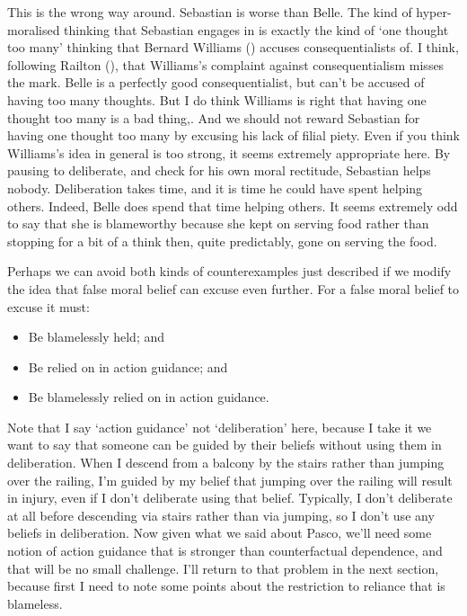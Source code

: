 \documentclass[
  10pt,
  letterpaper,
  twoside]{scrbook}
\providecommand{\tightlist}{%
  \setlength{\itemsep}{0pt}\setlength{\parskip}{0pt}}\usepackage{longtable,booktabs,array}
\begin{document}
This is the wrong way around. {Sebastian} is worse than {Belle}. The
kind of hyper-moralised thinking that {Sebastian} engages in is exactly
the kind of `one thought too many' thinking that Bernard Williams
() accuses consequentialists of. I
think, following Railton (), that
Williams's complaint against consequentialism misses the mark. {Belle}
is a perfectly good consequentialist, but can't be accused of having too
many thoughts. But I do think Williams is right that having one thought
too many is a bad thing,. And we should not reward {Sebastian} for
having one thought too many by excusing his lack of filial piety. Even
if you think Williams's idea in general is too strong, it seems
extremely appropriate here. By pausing to deliberate, and check for his
own moral rectitude, {Sebastian} helps nobody. Deliberation takes time,
and it is time he could have spent helping others. Indeed, {Belle} does
spend that time helping others. It seems extremely odd to say that she
is blameworthy because she kept on serving food rather than stopping for
a bit of a think then, quite predictably, gone on serving the food.

Perhaps we can avoid both kinds of counterexamples just described if we
modify the idea that false moral belief can excuse even further. For a
false moral belief to excuse it must:

\begin{itemize}
\tightlist
\item
  Be blamelessly held; and
\item
  Be relied on in action guidance; and
\item
  Be blamelessly relied on in action guidance.
\end{itemize}

Note that I say `action guidance' not `deliberation' here, because I
take it we want to say that someone can be guided by their beliefs
without using them in deliberation. When I descend from a balcony by the
stairs rather than jumping over the railing, I'm guided by my belief
that jumping over the railing will result in injury, even if I don't
deliberate using that belief. Typically, I don't deliberate at all
before descending via stairs rather than via jumping, so I don't use any
beliefs in deliberation. Now given what we said about {Pasco}, we'll
need some notion of action guidance that is stronger than counterfactual
dependence, and that will be no small challenge. I'll return to that
problem in the next section, because first I need to note some points
about the restriction to reliance that is blameless.
\end{document}
